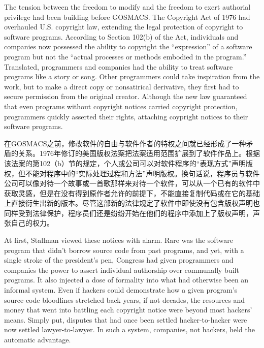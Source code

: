\ifdefined\eng
The tension between the freedom to modify and the freedom to exert authorial privilege had been building before GOSMACS. The Copyright Act of 1976 had overhauled U.S. copyright law, extending the legal protection of copyright to software programs. According to Section 102(b) of the Act, individuals and companies now possessed the ability to copyright the ``expression'' of a software program but not the ``actual processes or methods embodied in the program.'' Translated, programmers and companies had the ability to treat software programs like a story or song. Other programmers could take inspiration from the work, but to make a direct copy or nonsatirical derivative, they first had to secure permission from the original creator. Although the new law guaranteed that even programs without copyright notices carried copyright protection, programmers quickly asserted their rights, attaching coypright notices to their software programs.
\fi

\ifdefined\chs
在GOSMACS之前，修改软件的自由与软件作者的特权之间就已经形成了一种矛盾的关系。1976年修订的美国版权法案把法案适用范围扩展到了软件作品上。根据该法案的第102（b）节的规定，个人或公司可以对软件程序的``表现方式''声明版权，但不能对程序中的``实际处理过程和方法''声明版权。换句话说，程序员与软件公司可以像对待一个故事或一首歌那样来对待一个软件，可以从一个已有的软件中获取灵感，但是在没有得到原作者允许的前提下，不能直接复制代码或在它的基础上直接衍生出新的版本。尽管这部新的法律规定了软件中即使没有包含版权声明也同样受到法律保护，程序员们还是纷纷开始在他们的程序中添加上了版权声明，声张自己的权力。
\fi

\ifdefined\eng
At first, Stallman viewed these notices with alarm. Rare was the software program that didn't borrow source code from past programs, and yet, with a single stroke of the president's pen, Congress had given programmers and companies the power to assert individual authorship over communally built programs. It also injected a dose of formality into what had otherwise been an informal system. Even if hackers could demonstrate how a given program's source-code bloodlines stretched back years, if not decades, the resources and money that went into battling each copyright notice were beyond most hackers' means. Simply put, disputes that had once been settled hacker-to-hacker were now settled lawyer-to-lawyer. In such a system, companies, not hackers, held the automatic advantage.
\fi

